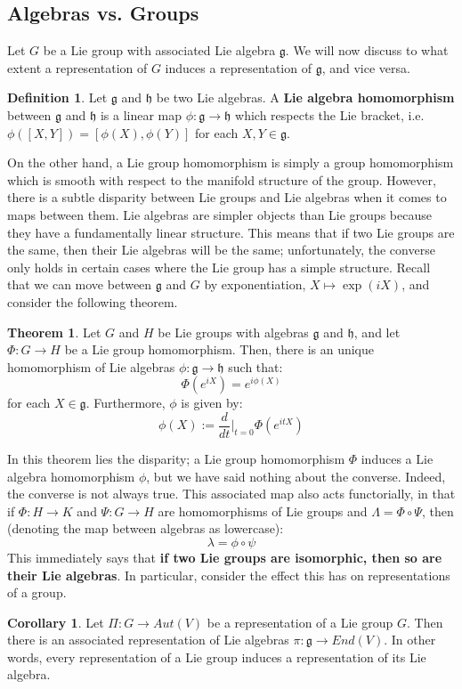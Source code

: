 \documentclass[11pt, oneside]{article}   	%
\theoremstyle{definition}
\newtheorem{definition}{Definition}[section]
\newtheorem{theorem}{Theorem}[section]
\newtheorem{corollary}{Corollary}[theorem]
\begin{document}
\subsection{Algebras vs. Groups}
Let $G$ be a Lie group with associated Lie algebra $\mathfrak g$. We will now discuss to what extent a representation 
of $G$ induces a representation of $\mathfrak g$, and vice versa. 
\begin{definition}
	Let $\mathfrak g$ and $\mathfrak h$ be two Lie algebras. A \textbf{Lie algebra homomorphism} between $\mathfrak g$ 
	and $\mathfrak h$ is a linear map $\phi : \mathfrak g\rightarrow\mathfrak h$ which respects the Lie bracket, i.e. 
	$\phi([X, Y]) = [\phi(X), \phi(Y)]$ for each $X, Y\in\mathfrak g$. 
\end{definition}
On the other hand, a Lie group homomorphism is simply a group homomorphism which is smooth with respect to 
the manifold structure of the group. However, there is a subtle disparity between Lie groups and Lie algebras when 
it comes to maps between them. Lie algebras are simpler objects than Lie groups because they have a fundamentally 
linear structure. This means that if two Lie groups are the same, then their Lie algebras will be the same; unfortunately, 
the converse only holds in certain cases where the Lie group has a simple structure. Recall that we can move between 
$\mathfrak g$ and $G$ by exponentiation, $X\mapsto \exp(iX)$, and consider the following theorem.
\begin{theorem}
	Let $G$ and $H$ be Lie groups with algebras $\mathfrak g$ and $\mathfrak h$, and let $\Phi : G\rightarrow H$ be a 
	Lie group homomorphism. Then, there is an unique homomorphism of Lie algebras $\phi : 
	\mathfrak g\rightarrow\mathfrak h$ such that:
	\begin{equation}
		\Phi(e^{iX}) = e^{i\phi(X)}
	\end{equation}
	for each $X\in\mathfrak g$. Furthermore, $\phi$ is given by:
	\begin{equation}
		\phi(X) := \frac{d}{dt}\bigg|_{t = 0}\Phi(e^{itX})
	\end{equation}
\end{theorem}
In this theorem lies the disparity; a Lie group homomorphism $\Phi$ induces a Lie algebra homomorphism $\phi$, 
but we have said nothing about the converse. Indeed, the converse is not always true. This associated map also 
acts functorially, in that if $\Phi : H\rightarrow K$ and $\Psi : G\rightarrow H$ are homomorphisms of Lie groups and 
$\Lambda = \Phi\circ\Psi$, then (denoting the map between algebras as lowercase):
\begin{equation}
	\lambda = \phi\circ\psi
\end{equation}
This immediately says that \textbf{if two Lie groups are isomorphic, then so are their Lie algebras}. In particular, 
consider the effect this has on representations of a group.
\begin{corollary}
	Let $\Pi : G\rightarrow Aut(V)$ be a representation of a Lie group $G$. Then there is an associated 
	representation of Lie algebras $\pi : \mathfrak g\rightarrow End(V)$. In other words, every representation 
	of a Lie group induces a representation of its Lie algebra.
\end{corollary}
\end{document}
